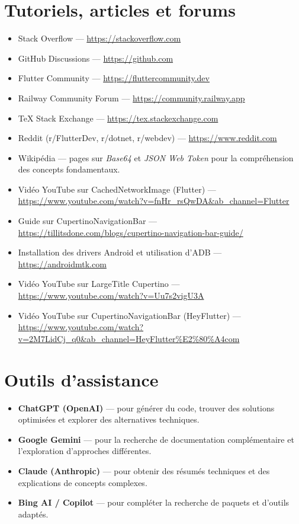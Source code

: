 \documentclass[12pt]{report}
\begin{document}
\section{Tutoriels, articles et forums}

\begin{itemize}
	\item Stack Overflow — \url{https://stackoverflow.com}
	\item GitHub Discussions — \url{https://github.com}
	\item Flutter Community — \url{https://fluttercommunity.dev}
	\item Railway Community Forum — \url{https://community.railway.app}
	\item TeX Stack Exchange — \url{https://tex.stackexchange.com}
	\item Reddit (r/FlutterDev, r/dotnet, r/webdev) — \url{https://www.reddit.com}
	\item Wikipédia — pages sur \textit{Base64} et \textit{JSON Web Token} pour la compréhension des concepts fondamentaux.
	\item Vidéo YouTube sur CachedNetworkImage (Flutter) — \url{https://www.youtube.com/watch?v=fnHr_rsQwDA&ab_channel=Flutter}
	\item Guide sur CupertinoNavigationBar — \url{https://tillitsdone.com/blogs/cupertino-navigation-bar-guide/}
	\item Installation des drivers Android et utilisation d’ADB — \url{https://androidmtk.com}
	\item Vidéo YouTube sur LargeTitle Cupertino — \url{https://www.youtube.com/watch?v=Uu7s2vigU3A}
	\item Vidéo YouTube sur CupertinoNavigationBar (HeyFlutter) — \url{https://www.youtube.com/watch?v=2M7LidCj_q0&ab_channel=HeyFlutter%E2%80%A4com}
\end{itemize}

\section{Outils d’assistance}

\begin{itemize}
	\item \textbf{ChatGPT (OpenAI)} — pour générer du code, trouver des solutions optimisées et explorer des alternatives techniques.
	\item \textbf{Google Gemini} — pour la recherche de documentation complémentaire et l’exploration d’approches différentes.
	\item \textbf{Claude (Anthropic)} — pour obtenir des résumés techniques et des explications de concepts complexes.
	\item \textbf{Bing AI / Copilot} — pour compléter la recherche de paquets et d’outils adaptés.
\end{itemize}
\end{document}

